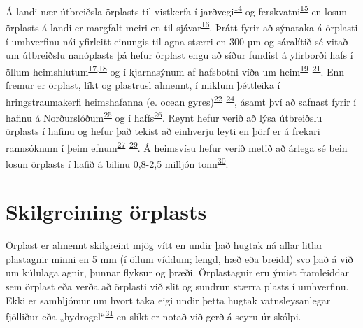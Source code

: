 \documentclass[icelandic,]{book}
\begin{document}
Á landi nær útbreiðsla örplasts til vistkerfa í jarðvegi\textsuperscript{\protect\hyperlink{ref-de2018impacts}{14}} og ferskvatni\textsuperscript{\protect\hyperlink{ref-besseling2017fate}{15}} en losun örplasts á landi er margfalt meiri en til sjávar\textsuperscript{\protect\hyperlink{ref-horton2017microplastics}{16}}. Þrátt fyrir að sýnataka á örplasti í umhverfinu nái yfirleitt einungis til agna stærri en 300 µm og sáralítið sé vitað um útbreiðslu nanóplasts þá hefur örplast engu að síður fundist á yfirborði hafs í öllum heimshlutum\textsuperscript{\protect\hyperlink{ref-eriksen2014plastic}{17},\protect\hyperlink{ref-cozar2014plastic}{18}} og í kjarnasýnum af hafsbotni víða um heim\textsuperscript{\protect\hyperlink{ref-goldberg1997plasticizing}{19}--\protect\hyperlink{ref-woodall2014deep}{21}}. Enn fremur er örplast, líkt og plastrusl almennt, í miklum þéttleika í hringstraumakerfi heimshafanna (e. ocean gyres)\textsuperscript{\protect\hyperlink{ref-law2010plastic}{22}--\protect\hyperlink{ref-lebreton2018evidence}{24}}, ásamt því að safnast fyrir í hafinu á Norðurslóðum\textsuperscript{\protect\hyperlink{ref-cozar2017arctic}{25}} og í hafís\textsuperscript{\protect\hyperlink{ref-obbard2014global}{26}}. Reynt hefur verið að lýsa útbreiðslu örplasts í hafinu og hefur það tekist að einhverju leyti en þörf er á frekari rannsóknum í þeim efnum\textsuperscript{\protect\hyperlink{ref-enders2015abundance}{27}--\protect\hyperlink{ref-auta2017distribution}{29}}. Á heimsvísu hefur verið metið að árlega sé bein losun örplasts í hafið á bilinu 0,8-2,5 milljón tonn\textsuperscript{\protect\hyperlink{ref-boucher2017primary}{30}}.

\hypertarget{skilgreining-orplasts}{%
\section*{Skilgreining örplasts}\label{skilgreining-orplasts}}

Örplast er almennt skilgreint mjög vítt en undir það hugtak ná allar litlar plastagnir minni en 5 mm (í öllum víddum; lengd, hæð eða breidd) svo það á við um kúlulaga agnir, þunnar flyksur og þræði. Örplastagnir eru ýmist framleiddar sem örplast eða verða að örplasti við slit og sundrun stærra plasts í umhverfinu. Ekki er samhljómur um hvort taka eigi undir þetta hugtak vatnsleysanlegar fjölliður eða „hydrogel``\textsuperscript{\protect\hyperlink{ref-Bergmann2015}{31}} en slíkt er notað við gerð á seyru úr skólpi.
\end{document}
